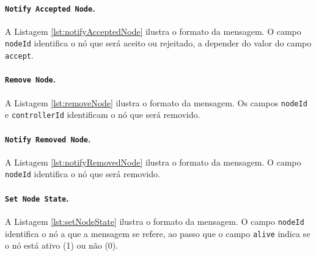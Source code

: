 \noindent
\begin{minipage}[l]{\linewidth}

\end{minipage}

\paragraph*{\texttt{Notify Accepted Node}.} A Listagem \ref{lst:notifyAcceptedNode} ilustra o formato da mensagem. O campo \texttt{nodeId} identifica o nó que será aceito ou rejeitado, a depender do valor do campo \texttt{accept}.

\noindent
\begin{minipage}[l]{\linewidth}

\end{minipage}

\paragraph*{\texttt{Remove Node}.} A Listagem \ref{lst:removeNode} ilustra o formato da mensagem. Os campos \texttt{nodeId} e \texttt{controllerId} identificam o nó que será removido.

\noindent
\begin{minipage}[l]{\linewidth}

\end{minipage}

\paragraph*{\texttt{Notify Removed Node}.} A Listagem \ref{lst:notifyRemovedNode} ilustra o formato da mensagem. O campo \texttt{nodeId} identifica o nó que será removido.

\noindent
\begin{minipage}[l]{\linewidth}

\end{minipage}

\paragraph*{\texttt{Set Node State}.} A Listagem \ref{lst:setNodeState} ilustra o formato da mensagem. O campo \texttt{nodeId} identifica o nó a que a mensagem se refere, ao passo que o campo \texttt{alive} indica se o nó está ativo (1) ou não (0).

